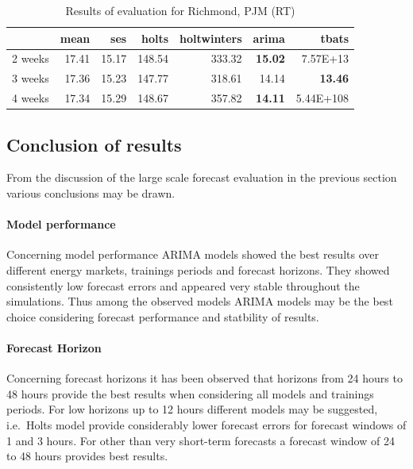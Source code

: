 \begin{table}[ht]
\centering
\begin{tabular}{rrrrrrr}
  \hline
 & mean & ses & holts & holtwinters & arima & tbats \\ 
  \hline
2 weeks & 17.41 & 15.17 & 148.54 & 333.32 & \textbf{15.02} & 7.57E+13 \\ 
  3 weeks & 17.36 & 15.23 & 147.77 & 318.61 & 14.14 & \textbf{ 13.46} \\ 
  4 weeks & 17.34 & 15.29 & 148.67 & 357.82 & \textbf{14.11} & 5.44E+108 \\  
   \hline
\end{tabular}
\caption{Results of evaluation for Richmond, PJM (RT)}
\label{tab:aggregated_results_pjm}
\end{table}



\subsection{Conclusion of results}

From the discussion of the large scale forecast evaluation in the previous section various conclusions may be drawn. 

\paragraph{Model performance}

Concerning model performance ARIMA models showed the best results over different energy markets, trainings periods and forecast horizons. 
They showed consistently low forecast errors and appeared very stable throughout the simulations. Thus among the observed models ARIMA models may be the best choice considering forecast performance and statbility of results. 

\paragraph{Forecast Horizon}

Concerning forecast horizons it has been observed that horizons from 24 hours to 48 hours provide the best results when considering all models and trainings periods. 
For low horizons up to 12 hours different models may be suggested, i.e.~Holts model provide considerably lower forecast errors for forecast windows of 1 and 3 hours. 
For other than very short-term forecasts a forecast window of 24 to 48 hours provides best results. 

